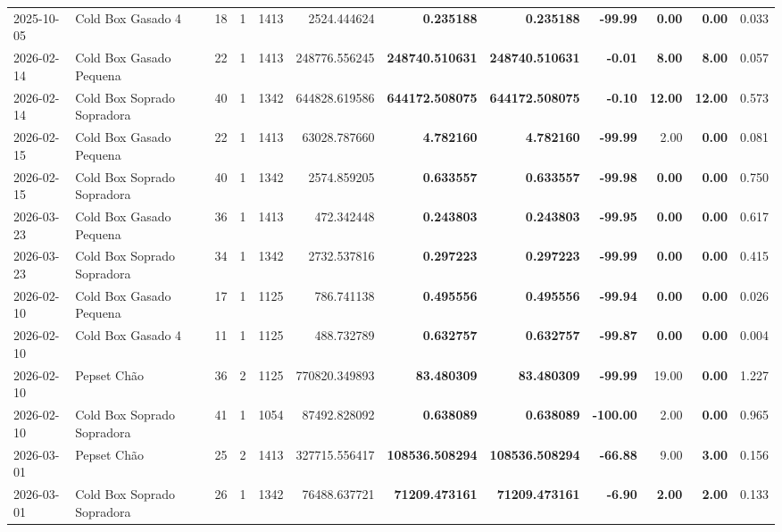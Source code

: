 {\begin{center}
{\begin{tabular}{@{}llrrrrrrrrrr@{}}
2025-10-05 & Cold Box Gasado 4 & 18 & 1 & 1413 & 2524.444624 & \textbf{0.235188} & \textbf{0.235188} & \textbf{-99.99} & \textbf{0.00} & \textbf{0.00} & 0.033 \\
2026-02-14 & Cold Box Gasado Pequena & 22 & 1 & 1413 & 248776.556245 & \textbf{248740.510631} & \textbf{248740.510631} & \textbf{-0.01} & \textbf{8.00} & \textbf{8.00} & 0.057 \\
2026-02-14 & Cold Box Soprado Sopradora & 40 & 1 & 1342 & 644828.619586 & \textbf{644172.508075} & \textbf{644172.508075} & \textbf{-0.10} & \textbf{12.00} & \textbf{12.00} & 0.573 \\
2026-02-15 & Cold Box Gasado Pequena & 22 & 1 & 1413 & 63028.787660 & \textbf{4.782160} & \textbf{4.782160} & \textbf{-99.99} & 2.00 & \textbf{0.00} & 0.081 \\
2026-02-15 & Cold Box Soprado Sopradora & 40 & 1 & 1342 & 2574.859205 & \textbf{0.633557} & \textbf{0.633557} & \textbf{-99.98} & \textbf{0.00} & \textbf{0.00} & 0.750 \\
2026-03-23 & Cold Box Gasado Pequena & 36 & 1 & 1413 & 472.342448 & \textbf{0.243803} & \textbf{0.243803} & \textbf{-99.95} & \textbf{0.00} & \textbf{0.00} & 0.617 \\
2026-03-23 & Cold Box Soprado Sopradora & 34 & 1 & 1342 & 2732.537816 & \textbf{0.297223} & \textbf{0.297223} & \textbf{-99.99} & \textbf{0.00} & \textbf{0.00} & 0.415 \\
2026-02-10 & Cold Box Gasado Pequena & 17 & 1 & 1125 & 786.741138 & \textbf{0.495556} & \textbf{0.495556} & \textbf{-99.94} & \textbf{0.00} & \textbf{0.00} & 0.026 \\
2026-02-10 & Cold Box Gasado 4 & 11 & 1 & 1125 & 488.732789 & \textbf{0.632757} & \textbf{0.632757} & \textbf{-99.87} & \textbf{0.00} & \textbf{0.00} & 0.004 \\
2026-02-10 & Pepset Chão & 36 & 2 & 1125 & 770820.349893 & \textbf{83.480309} & \textbf{83.480309} & \textbf{-99.99} & 19.00 & \textbf{0.00} & 1.227 \\
2026-02-10 & Cold Box Soprado Sopradora & 41 & 1 & 1054 & 87492.828092 & \textbf{0.638089} & \textbf{0.638089} & \textbf{-100.00} & 2.00 & \textbf{0.00} & 0.965 \\
2026-03-01 & Pepset Chão & 25 & 2 & 1413 & 327715.556417 & \textbf{108536.508294} & \textbf{108536.508294} & \textbf{-66.88} & 9.00 & \textbf{3.00} & 0.156 \\
2026-03-01 & Cold Box Soprado Sopradora & 26 & 1 & 1342 & 76488.637721 & \textbf{71209.473161} & \textbf{71209.473161} & \textbf{-6.90} & \textbf{2.00} & \textbf{2.00} & 0.133 \\

\end{tabular}}
\end{center}}
